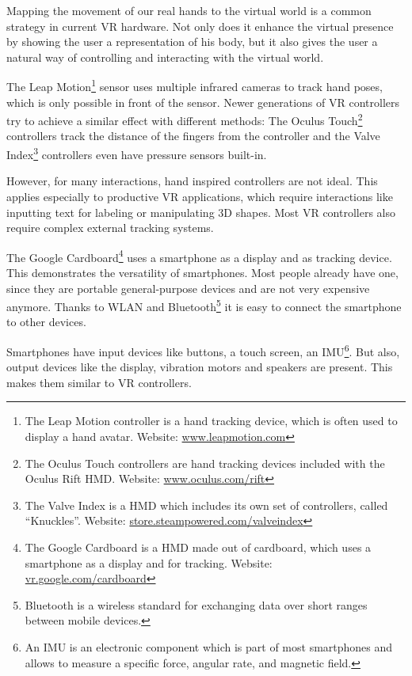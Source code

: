 Mapping the movement of our real hands to the virtual world is a common strategy in current \ac{VR} hardware. Not only does it enhance the virtual presence by showing the user a representation of his body, but it also gives the user a natural way of controlling and interacting with the virtual world. 

The Leap Motion\footnote{The Leap Motion controller is a hand tracking device, which is often used to display a hand avatar. Website: \href{https://www.leapmotion.com/}{www.leapmotion.com}} sensor uses multiple infrared cameras to track hand poses, which is only possible in front of the sensor. Newer generations of \ac{VR} controllers try to achieve a similar effect with different methods: The Oculus Touch\footnote{The Oculus Touch controllers are hand tracking devices included with the Oculus Rift \ac{HMD}. Website: \href{https://www.oculus.com/rift/}{www.oculus.com/rift}} controllers track the distance of the fingers from the controller and the Valve Index\footnote{The Valve Index is a \ac{HMD} which includes its own set of controllers, called \enquote{Knuckles}. Website: \href{https://store.steampowered.com/valveindex}{store.steampowered.com/valveindex}} controllers even have pressure sensors built-in.

However, for many interactions, hand inspired controllers are not ideal. This applies especially to productive \ac{VR} applications, which require interactions like inputting text for labeling or manipulating \ac{3D} shapes. Most \ac{VR} controllers also require complex external tracking systems. 

The Google Cardboard\footnote{The Google Cardboard is a \ac{HMD} made out of cardboard, which uses a smartphone as a display and for tracking. Website: \href{https://vr.google.com/cardboard/}{vr.google.com/cardboard}} uses a smartphone as a display and as tracking device. This demonstrates the versatility of smartphones. Most people already have one, since they are portable general-purpose devices and are not very expensive anymore. Thanks to \ac{WLAN} and Bluetooth\footnote{Bluetooth is a wireless standard for exchanging data over short ranges between mobile devices.} it is easy to connect the smartphone to other devices. 

Smartphones have input devices like buttons, a touch screen, an \ac{IMU}\footnote{An IMU is an electronic component which is part of most smartphones and allows to measure a specific force, angular rate, and magnetic field.}. But also, output devices like the display, vibration motors and speakers are present. This makes them similar to \ac{VR} controllers. 

